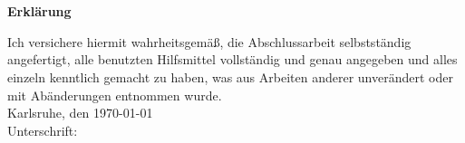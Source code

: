 \setcounter{page}{3}       %

\chapter*{}
\centerline{\Large \textsf{\textbf{Erklärung}}} \label{Erklaerung}%
\vspace*{2ex}
%
Ich versichere hiermit wahrheitsgemäß, die Abschlussarbeit selbstständig angefertigt, alle benutzten Hilfsmittel vollständig und genau angegeben und alles einzeln kenntlich gemacht zu haben, was aus Arbeiten anderer unverändert oder mit Abänderungen entnommen wurde.\\

\vspace*{4ex}
Karlsruhe, den \today \\

\vspace*{4ex} 
Unterschrift:\\



\raggedbottom
\cleardoublepage
\thispagestyle{scrheadings}
\clearscrheadfoot